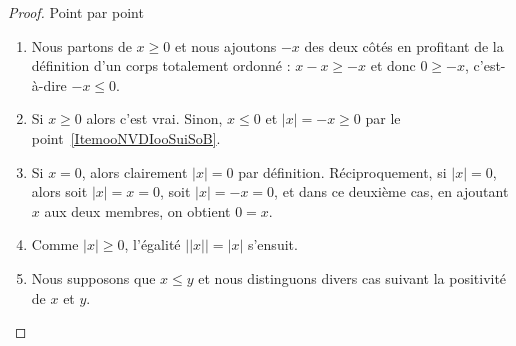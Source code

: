 \begin{proof}
    Point par point
    \begin{enumerate}
        \item
            Nous partons de \( x\geq 0\) et nous ajoutons \( -x\) des deux côtés en profitant de la définition d'un corps totalement ordonné : \( x-x\geq -x\) et donc \( 0\geq-x\), c'est-à-dire \( -x\leq 0\).
        \item
            Si \( x\geq 0\) alors c'est vrai. Sinon, \( x\leq 0\) et \( | x |=-x\geq 0\) par le point~\ref{ItemooNVDIooSuiSoB}.
        \item
          Si \( x=0\), alors clairement \( | x |=0\) par définition. Réciproquement, si \( | x | = 0 \), alors soit \( | x | = x = 0 \), soit \( | x | = -x = 0\), et dans ce deuxième cas, en ajoutant \( x \) aux deux membres, on obtient \( 0 = x \).
        \item
          Comme \(| x | \geq 0 \), l'égalité \( \bigl|| x |\bigr| = |x|  \) s'ensuit. 
        \item
            Nous supposons que \( x\leq y\) et nous distinguons divers cas suivant la positivité de \( x\) et \( y\).
\end{enumerate}
\end{proof}
